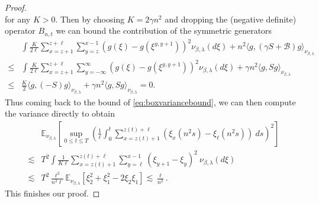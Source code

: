 \documentclass[10pt,a4paper]{amsart}
\newcommand{\ee}[1]{\mathbb{E}_{\nu_{\beta,\lambda}}\left[ #1 \right]}
\newcommand{\parent}[1]{\left( #1 \right)}
\begin{document}
\begin{proof}
\begin{equation*}
\end{equation*}
for any $K>0$. Then by choosing $K =2\gamma n^2 $ and dropping the (negative definite) operator $B_{n,t}$ we can bound the contribution of the symmetric generators
\begin{equation*}
\begin{split}
    &\int \frac{K}{2\ell} \sum_{x=z+1 }^{z+\ell} \sum_{y = z}^{x-1} (g(\xi)- g(\xi^{y,y+1}))^2 \nu_{\beta,\lambda}(d\xi) + n^2  \langle g,(\gamma S +\mathcal{B})g \rangle_{\nu_{\beta,\lambda}}  \\ 
    \leq  &\int \frac{K}{2\ell} \sum_{x=z+1 }^{z+\ell} \sum_{y = -{\infty}}^{\infty} (g(\xi)- g(\xi^{y,y+1}))^2 \nu_{\beta,\lambda}(d\xi) + \gamma n^2  \langle g, S g \rangle_{\nu_{\beta,\lambda}}\\
    \leq & \frac{K}{2}\langle g, (-S) g \rangle_{\nu_{\beta,\lambda}} + \gamma n^2  \langle g, S g \rangle_{\nu_{\beta,\lambda}} = 0.
\end{split}
\end{equation*} 
Thus coming back to the bound of \eqref{eq:boxvariancebound}, we can then compute the variance directly to obtain
\begin{equation*}
\begin{split}
    &\ee{\sup_{0\leq t\leq T} \parent{\frac{1}{\ell}\int_0^t \sum_{x=z(t)+1 }^{z(t)+\ell}(\xi_{x}(n^2 s) -\xi_\ell(n^2 s))\  ds }^2}\\
    \lesssim&   T^2\int \frac{1}{K\ell} \sum_{x=z(t)+1 }^{z(t)+\ell} \sum_{y = \ell}^{x-1} (\xi_{y+1} -\xi_y)^2 \ \nu_{\beta,\lambda}(d\xi)    \\
    \lesssim &  T^2\frac{\ell^2}{ n^2 \ell} \ee{\xi_{2}^2 + \xi_{1}^2 - 2\xi_{2}\xi_{1}} \lesssim \frac{\ell}{n^2}.
\end{split}
\end{equation*}
This finishes our proof.
\end{proof}
\end{document}

